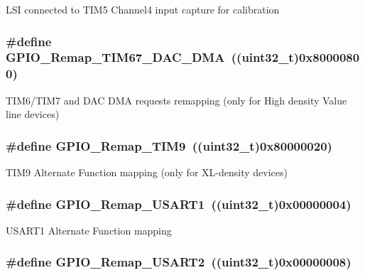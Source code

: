 \label{group__GPIO__Remap__define_gad909488d0b7a0cfa1116a66e962e3c62}
LSI connected to TIM5 Channel4 input capture for calibration \hypertarget{group__GPIO__Remap__define_gae69d46a269c2284c8cc6a90742e89b12}{
\subsubsection[{GPIO\_\-Remap\_\-TIM67\_\-DAC\_\-DMA}]{\setlength{\rightskip}{0pt plus 5cm}\#define GPIO\_\-Remap\_\-TIM67\_\-DAC\_\-DMA~((uint32\_\-t)0x80000800)}}
\label{group__GPIO__Remap__define_gae69d46a269c2284c8cc6a90742e89b12}
TIM6/TIM7 and DAC DMA requests remapping (only for High density Value line devices) \hypertarget{group__GPIO__Remap__define_gadfed4d88bc9a4093d16ce64a85b6051a}{
\subsubsection[{GPIO\_\-Remap\_\-TIM9}]{\setlength{\rightskip}{0pt plus 5cm}\#define GPIO\_\-Remap\_\-TIM9~((uint32\_\-t)0x80000020)}}
\label{group__GPIO__Remap__define_gadfed4d88bc9a4093d16ce64a85b6051a}
TIM9 Alternate Function mapping (only for XL-\/density devices) \hypertarget{group__GPIO__Remap__define_ga804d946c5ca246a1f02f73a086586fd6}{
\subsubsection[{GPIO\_\-Remap\_\-USART1}]{\setlength{\rightskip}{0pt plus 5cm}\#define GPIO\_\-Remap\_\-USART1~((uint32\_\-t)0x00000004)}}
\label{group__GPIO__Remap__define_ga804d946c5ca246a1f02f73a086586fd6}
USART1 Alternate Function mapping \hypertarget{group__GPIO__Remap__define_gaeb2ebb12e23138509af20dce1fc6c246}{
\subsubsection[{GPIO\_\-Remap\_\-USART2}]{\setlength{\rightskip}{0pt plus 5cm}\#define GPIO\_\-Remap\_\-USART2~((uint32\_\-t)0x00000008)}}
